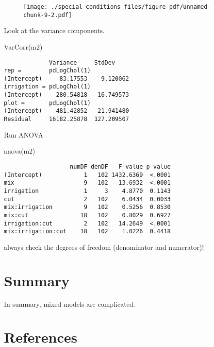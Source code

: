 \documentclass[
  letterpaper,
  DIV=11,
  numbers=noendperiod]{scrreprt}
\newenvironment{Shaded}{\begin{snugshade}}{\end{snugshade}}
\newcommand{\FunctionTok}[1]{\textcolor[rgb]{0.28,0.35,0.67}{#1}}
\newcommand{\NormalTok}[1]{\textcolor[rgb]{0.00,0.23,0.31}{#1}}
\newlength{\cslhangindent}
\newlength{\cslentryspacingunit} %
\newenvironment{CSLReferences}[2] %
 {%
  \setlength{\parindent}{0pt}
  \ifodd #1
  \let\oldpar\par
  \def\par{\hangindent=\cslhangindent\oldpar}
  \fi
  \setlength{\parskip}{#2\cslentryspacingunit}
 }%
 {}
\begin{document}
\begin{figure}[H]

{\centering \texttt{[image: ./special\_conditions\_files/figure-pdf/unnamed-chunk-9-2.pdf]}

}

\end{figure}

Look at the variance components.

\begin{Shaded}
\begin{Highlighting}[]
\FunctionTok{VarCorr}\NormalTok{(m2)}
\end{Highlighting}
\end{Shaded}

\begin{verbatim}
             Variance     StdDev    
rep =        pdLogChol(1)           
(Intercept)     83.17553    9.120062
irrigation = pdLogChol(1)           
(Intercept)    280.54818   16.749573
plot =       pdLogChol(1)           
(Intercept)    481.42852   21.941480
Residual     16182.25878  127.209507
\end{verbatim}

Run ANOVA

\begin{Shaded}
\begin{Highlighting}[]
\FunctionTok{anova}\NormalTok{(m2)}
\end{Highlighting}
\end{Shaded}

\begin{verbatim}
                   numDF denDF   F-value p-value
(Intercept)            1   102 1432.6369  <.0001
mix                    9   102   13.6932  <.0001
irrigation             1     3    4.8770  0.1143
cut                    2   102    6.0434  0.0033
mix:irrigation         9   102    0.5256  0.8530
mix:cut               18   102    0.8029  0.6927
irrigation:cut         2   102   14.2649  <.0001
mix:irrigation:cut    18   102    1.0226  0.4418
\end{verbatim}

always check the degrees of freedom (denominator and numerator)!


\hypertarget{summary}{%
\chapter{Summary}\label{summary}}

In summary, mixed models are complicated.


\hypertarget{references}{%
\chapter*{References}\label{references}}

\hypertarget{refs}{}
\begin{CSLReferences}{0}{0}
\end{CSLReferences}
\end{document}
